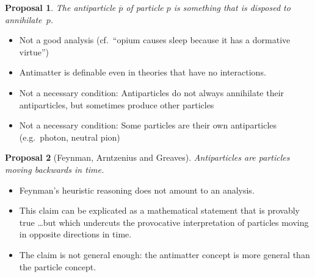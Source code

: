 \documentclass{beamer}
\def\ol{\overline}
\newtheorem{prop}{Proposal}
\begin{document}
\begin{frame}

\begin{prop} The antiparticle $\ol p$ of particle $p$ is something
    that is disposed to \emph{annihilate}~$p$.  \end{prop}

\bigskip \pause
\begin{itemize}
\item Not a good analysis (cf.\ ``opium causes sleep because it has a
  dormative virtue'') \pause
\item Antimatter is definable even in theories that have no
  interactions. \pause
\item Not a necessary condition: Antiparticles do not always
  annihilate their antiparticles, but sometimes produce other
  particles \pause
\item Not a necessary condition: Some particles are their own
  antiparticles (e.g.\ photon, neutral pion)
\end{itemize}
\end{frame}


\begin{frame}
  \begin{prop}[Feynman, Arntzenius and Greaves] Antiparticles are
    particles moving backwards in time. \end{prop} \pause

  \begin{itemize}
  \item Feynman's heuristic reasoning does not amount to an
    analysis. \pause
  \item This claim can be explicated as a mathematical statement that
    is provably true \dots but which undercuts the provocative
    interpretation of particles moving in opposite directions in
    time. \pause
  \item The claim is not general enough: the antimatter concept is
    more general than the particle concept.

  \end{itemize}

\end{frame}
\end{document}

